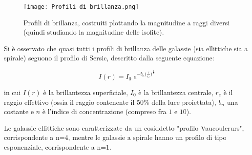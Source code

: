 \begin{figure}
    \centering
    \texttt{[image: Profili di brillanza.png]}
    \caption{Profili di brillanza, costruiti plottando la magnitudine a raggi diversi (quindi studiando la magnitudine delle isofite).}
    \label{fig:profili-brillanza}
\end{figure}

Si è osservato che quasi tutti i profili di brillanza delle galassie (sia ellittiche sia a spirale) seguono il profilo di Sersic, descritto dalla seguente equazione:

\begin{equation*}
    I(r) = I_0 \; e^{-b_n \big(\frac{r}{r_e}\big)^\frac{1}{n}}
\end{equation*}

in cui $I(r)$ è la brillantezza superficiale, $I_0$ è la brillantezza centrale, $r_e$ è il raggio effettivo (ossia il raggio contenente il 50\% della luce proiettata), $b_n$ una costante e $n$ è l'indice di concentrazione (compreso fra $1$ e $10$).

Le galassie ellittiche sono caratterizzate da un cosiddetto "profilo Vaucoulerurs", corrispondente a n=4, mentre le galassie a spirale hanno un profilo di tipo esponenziale, corrispondente a n=1. 